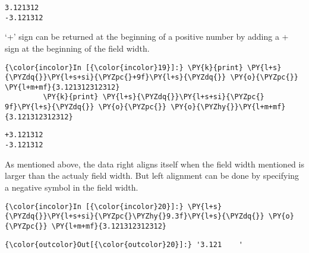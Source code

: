     \begin{Verbatim}[commandchars=\\\{\}]
3.121312
-3.121312
    \end{Verbatim}

    `+' sign can be returned at the beginning of a positive number by adding
a + sign at the beginning of the field width.

    \begin{Verbatim}[commandchars=\\\{\}]
{\color{incolor}In [{\color{incolor}19}]:} \PY{k}{print} \PY{l+s}{\PYZdq{}}\PY{l+s+si}{\PYZpc{}+9f}\PY{l+s}{\PYZdq{}} \PY{o}{\PYZpc{}} \PY{l+m+mf}{3.121312312312}
         \PY{k}{print} \PY{l+s}{\PYZdq{}}\PY{l+s+si}{\PYZpc{} 9f}\PY{l+s}{\PYZdq{}} \PY{o}{\PYZpc{}} \PY{o}{\PYZhy{}}\PY{l+m+mf}{3.121312312312}
\end{Verbatim}

    \begin{Verbatim}[commandchars=\\\{\}]
+3.121312
-3.121312
    \end{Verbatim}

    As mentioned above, the data right aligns itself when the field width
mentioned is larger than the actualy field width. But left alignment can
be done by specifying a negative symbol in the field width.

    \begin{Verbatim}[commandchars=\\\{\}]
{\color{incolor}In [{\color{incolor}20}]:} \PY{l+s}{\PYZdq{}}\PY{l+s+si}{\PYZpc{}\PYZhy{}9.3f}\PY{l+s}{\PYZdq{}} \PY{o}{\PYZpc{}} \PY{l+m+mf}{3.121312312312}
\end{Verbatim}

            \begin{Verbatim}[commandchars=\\\{\}]
{\color{outcolor}Out[{\color{outcolor}20}]:} '3.121    '
\end{Verbatim}
        

  \newpage
  
    
    
    
    
